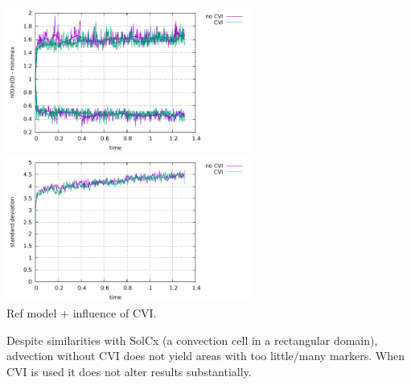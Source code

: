 \begin{center}
\includegraphics[width=8cm]{python_codes/fieldstone_30/results_box/markercount_cvi}
\includegraphics[width=8cm]{python_codes/fieldstone_30/results_box/stdev_cvi}\\
{\captionfont Ref model + influence of CVI.}
\end{center}

Despite similarities with SolCx (a convection cell in a rectangular domain),
advection without CVI does not yield areas with too little/many markers.
When CVI is used it does not alter results substantially.
